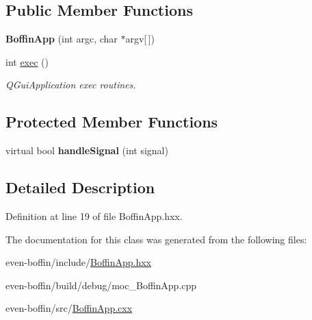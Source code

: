 \subsection*{Public Member Functions}
\begin{DoxyCompactItemize}
\item 
\mbox{\label{classeven_1_1_boffin_app_aaf919941de8b839849498d78c7bae220}} 
{\bfseries Boffin\+App} (int argc, char $\ast$argv\mbox{[}$\,$\mbox{]})
\item 
\mbox{\label{classeven_1_1_boffin_app_a0825e5e419c4bb9b81d88a67ed0fd73c}} 
int \mbox{\hyperlink{classeven_1_1_boffin_app_a0825e5e419c4bb9b81d88a67ed0fd73c}{exec}} ()
\begin{DoxyCompactList}\small\item\em Q\+Gui\+Application exec routines. \end{DoxyCompactList}\end{DoxyCompactItemize}
\subsection*{Protected Member Functions}
\begin{DoxyCompactItemize}
\item 
\mbox{\label{classeven_1_1_boffin_app_ac3dcc76705e42e15301cc34f7230aede}} 
virtual bool {\bfseries handle\+Signal} (int signal)
\end{DoxyCompactItemize}


\subsection{Detailed Description}


Definition at line 19 of file Boffin\+App.\+hxx.



The documentation for this class was generated from the following files\+:\begin{DoxyCompactItemize}
\item 
even-\/boffin/include/\mbox{\hyperlink{_boffin_app_8hxx}{Boffin\+App.\+hxx}}\item 
even-\/boffin/build/debug/moc\+\_\+\+Boffin\+App.\+cpp\item 
even-\/boffin/src/\mbox{\hyperlink{_boffin_app_8cxx}{Boffin\+App.\+cxx}}\end{DoxyCompactItemize}
